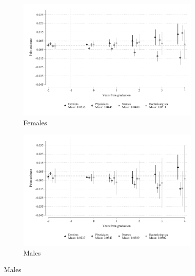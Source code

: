 \documentclass[12pt, a4paper]{article}
\begin{document}
\begin{figure}[H]
\centering
\caption{Probability of having a mental condition by gender}
\begin{subfigure}{.5\textwidth}
  \centering
  \includegraphics[width=\linewidth]{Figures/Callaway SantAnna/ES_service_mental_forever_female.pdf}
  \caption{Females}
  \label{fig:mental_forever_female}
\end{subfigure}%
\begin{subfigure}{.5\textwidth}
  \centering
  \includegraphics[width=\linewidth]{Figures/Callaway SantAnna/ES_service_mental_forever_male.pdf}
  \caption{Males}
  \label{fig:mental_forever_male}
\end{subfigure}
\label{fig:mental_forever_gender}
\end{figure}
\end{document}
